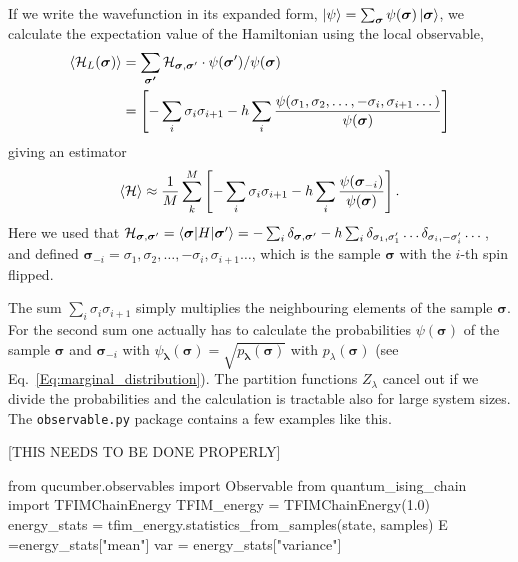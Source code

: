 \documentclass[submission, Phys]{SciPost}
\begin{document}
If we write the wavefunction in its expanded form, $\ket{\psi} = \sum_{\bm{\sigma}} \psi(\bm{\sigma}) \ket{\bm{\sigma}} $,
we calculate the expectation value of the Hamiltonian using the local observable,
\begin{align}
    \braket{ \mathcal{H}_L({\bm{\sigma}})} & = \sum_{ \bm{\sigma'}} \mathcal{H}_{\bm{\sigma}, \bm{\sigma}'} \cdot \psi(\bm{\sigma}') / \psi(\bm{\sigma})                                                     \\
	                             & =  \left[ -\sum_i \sigma_i \sigma_{i+1} - h \sum_i \frac{\psi(\sigma_1, \sigma_2, \dots , -\sigma_i, \sigma_{i+1} \dots)}{\psi (\bm{\sigma})} \right]
\end{align}
giving an estimator
\begin{equation}
	\braket{ \mathcal{H}} \approx \frac{1}{M} \sum_k^M \left[ -\sum_i \sigma_i \sigma_{i+1} - h \sum_i \frac{\psi (\bm{\sigma}_{-i})}{\psi (\bm{\sigma})} \right].
\end{equation}
Here we used that $\mathcal{H}_{\bm{\sigma}, \bm{\sigma}'} = \braket{\bm{\sigma} | H | \bm{\sigma}'} = -\sum_i \delta_{\bm{\sigma}, \bm{\sigma}'} - h \sum_i \delta_{\sigma_1, \sigma_1'} \dots \delta_{\sigma_i, -\sigma_i'} \dots$, and defined $\bm{\sigma}_{-i} = \sigma_1, \sigma_2, \dots , -\sigma_i, \sigma_{i+1} \dots$, which is the sample $\bm{\sigma}$ with the $i$-th spin flipped.

The sum $\sum_i \sigma_i \sigma_{i+1}$ simply multiplies the neighbouring elements of the sample $\bm{\sigma}$. For the second sum one actually has to calculate the probabilities $\psi (\bm{\sigma})$ of the sample $\bm{\sigma}$ and $\bm{\sigma}_{-i} $ with
$\psi_{\bm{\lambda}}(\bm{\sigma}) = \sqrt{p_{\bm{\lambda}}(\bm{\sigma})}$
with $p_{\lambda}(\bm{\sigma})$ (see Eq.~\ref{Eq:marginal_distribution}). The partition functions $Z_{\lambda}$ cancel out if we divide the probabilities and the calculation is tractable also for large system sizes.
The \verb|observable.py| package contains a few examples like this.

[THIS NEEDS TO BE DONE PROPERLY]
\begin{python}
from qucumber.observables import Observable
from quantum_ising_chain import TFIMChainEnergy
TFIM_energy = TFIMChainEnergy(1.0)
energy_stats = tfim_energy.statistics_from_samples(state, samples)
E =energy_stats["mean"]
var = energy_stats["variance"]
\end{python}
\end{document}
